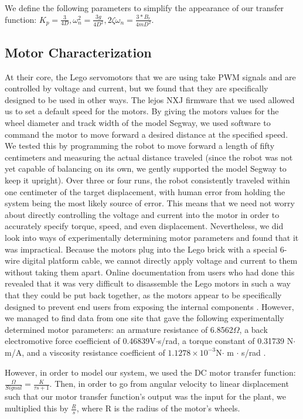 \documentclass[onecolumn, draftclass]{IEEEtran} %
\begin{document}
 We define the following parameters to simplify the appearance of our transfer function: $K_p = \frac{3}{4D}, \omega_n^2 = \frac{3g}{4D^2}, 2\zeta\omega_n = \frac{3*B_r}{4mD^2}$.

\subsection{Motor Characterization}
At their core, the Lego servomotors that we are using take PWM signals and are controlled by voltage and current, but we found that they are specifically designed to be used in other ways.  The lejos NXJ firmware that we used allowed us to set a default speed for the motors.  By giving the motors values for the wheel diameter and track width of the model Segway, we used software to command the motor to move forward a desired distance at the specified speed.  We tested this by programming the robot to move forward a length of fifty centimeters and measuring the actual distance traveled (since the robot was not yet capable of balancing on its own, we gently supported the model Segway to keep it upright).  Over three or four runs, the robot consistently traveled within one centimeter of the target displacement, with human error from holding the system being the most likely source of error.  This means that we need not worry about directly controlling the voltage and current into the motor in order to accurately specify torque, speed, and even displacement.
Nevertheless, we did look into ways of experimentally determining motor parameters and found that it was impractical.  Because the motors plug into the Lego brick with a special 6-wire digital platform cable, we cannot directly apply voltage and current to them without taking them apart.  Online documentation from users who had done this revealed that it was very difficult to disassemble the Lego motors in such a way that they could be put back together, as the motors appear to be specifically designed to prevent end users from exposing the internal components \cite{nxtInternals}.  However, we managed to find data from one site that gave the following experimentally determined motor parameters:
an armature resistance of 6.8562$\Omega$, a back electromotive force coefficient of 0.46839V$\cdot$s/rad, a torque constant of 0.31739 N$\cdot$m/A, and a viscosity resistance coefficient of $1.1278 \times 10^{-3} $N$\cdot$ m $\cdot$ s/rad \cite{watanabe}.

However, in order to model our system, we used the DC motor transfer function: $\frac{\Omega}{Signal} = \frac{K}{\tau s +1}$.  Then, in order to go from angular velocity to linear displacement such that our motor transfer function's output was the input for the plant, we multiplied this by $\frac{R}{s}$, where R is the radius of the motor's wheels.
\end{document}
